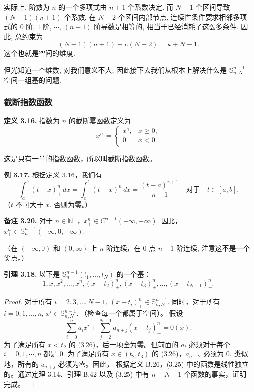 \documentclass[a4paper]{ctexart}
\begin{document}
{实际上, 阶数为 $n$ 的一个多项式由 $n + 1$ 个系数决定. 
而 $N - 1$ 个区间导致 $(N - 1)(n + 1)$ 个系数. 
在 $N - 2$ 个区间内部节点, 连续性条件要求相邻多项式的 $0$ 阶, $1$ 阶,
$\cdots$, $(n - 1)$ 阶导数是相等的, 相当于已经消耗了这么多条件. 因此, 
总约束为 
$$
(N - 1)(n + 1) - n(N - 2) = n + N - 1.
$$
这个也就是空间的维度.

但光知道一个维数, 对我们意义不大, 因此接下去我们从根本上解决什么是
$\mathbb{S}_{n, N}^{n - 1}$ 空间一组基的问题. 

\subsubsection{截断指数函数}

\noindent \textbf{定义 3.16.} 指数为 $n$ 的截断幂函数定义为
\[
x_+^n = \left\{
\begin{array}{ll}
  x^n, & x \geq 0,\\
  0, & x < 0.
\end{array}\right.
\]

这是只有一半的指数函数，所以叫截断指数函数。

 \noindent \textbf{例 3.17.} 根据定义 3.16，我们有
 \[
 \int_{a}^{b} (t - x)_+^n \, dx = \int_{a}^{t} (t - x)^n \, dx  = \frac{(t - a)^{n+1}}{n+1} \quad \text{对于} \quad t \in [a, b].
 \]
（$t$ 不可大于 $x$. 否则为零。）

\noindent \textbf{备注 3.20.} 对于 $n \in \mathbb{N}^+$，$x_+^n \in C^{n-1}(-\infty, +\infty)$. 因此，$x_+^n \in \mathbb{S}^{n-1}_n(-\infty, 0, +\infty)$.

（在 $(-\infty, 0)$ 和 $(0, \infty)$ 上 $n$ 阶连续，在 $0$ 点 $n - 1$ 阶连续, 注意这不是一个尖点。）

\noindent \textbf{引理 3.18.} 以下是 $\mathbb{S}_{n}^{n-1}\left(t_{1},\ldots, t_{N}\right)$ 的一个基：
\[
1, x, x^{2},\ldots, x^{n},\left(x-t_{2}\right)_{+}^{n},\left(x-t_{3}\right)_{+}^{n},\ldots,\left(x-t_{N-1}\right)_{+}^{n}. \tag{3.25}
\]

\begin{proof}
对于所有 $i=2, 3, \ldots, N - 1$, $\left(x - t_{i}\right)_{+}^{n} \in \mathbb{S}_{n, N}^{n-1}$. 
同时，对于所有 $i=0, 1, \ldots, n$, $x^{i} \in \mathbb{S}_{n, N}^{n-1}$. （检查每一个都属于空间）。 假设
\[
\sum_{i = 0}^{n} a_{i} x^{i} + \sum_{j = 2}^{N - 1} a_{n + j}\left(x - t_{j}\right)_{+}^{n} = 0(x). \tag{3.26}
\]
为了满足所有 $x < t_{2}$ 的 (3.26)，后一项全为零。但前面的 $a_{i}$ 必须对于每个 $i = 0, 1, \cdots, n$ 都是 $0$. 
为了满足所有 $x \in (t_{2}, t_{3})$ 的 (3.26)，$a_{n + 2}$ 必须为 $0$. 类似地，所有的 $a_{n + j}$ 必须为零。因此，
根据定义 B.26，(3.25) 中的函数是线性独立的。通过定理 3.14、引理 B.42 以及 (3.25) 中有 $n + N - 1$ 个函数的事实，证明完成。
\end{proof}

}
\end{document}
